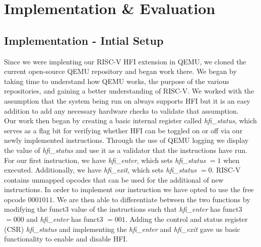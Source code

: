 \documentclass[conference,compsoc]{IEEEtran}
\begin{document}

\section{Implementation \& Evaluation}
\subsection{Implementation - Intial Setup}
Since we were implenting our RISC-V HFI extension in QEMU, we cloned the current open-source QEMU repository and began work there. We began by taking time to understand how QEMU works, the purpose of the various repositories, and gaining a better understanding of RISC-V. We worked with the assumption that the system being run on always supports HFI but it is an easy addition to add any necessary hardware checks to validate that assumption.\\
Our work then began by creating a basic internal register called \textit{hfi\_status}, which serves as a flag bit for verifying whether HFI can be toggled on or off via our newly implemented instructions. Through the use of QEMU logging we display the value of \textit{hfi\_status} and use it as a validator that the instructions have run.
For our first instruction, we have \textit{hfi\_enter}, which sets \textit{hfi\_status} $=1$ when executed. 
Additionally, we have \textit{hfi\_exit}, which sets \textit{hfi\_status} $=0$.
RISC-V contains unmapped opcodes that can be used for the additional of new instructions.
In order to implement our instruction we have opted to use the free opcode $0001011$.
We are then able to differentiate between the two functions by modifying the funct3 value of the instructions such that \textit{hfi\_enter} has funct3 $= 000$ and \textit{hfi\_enter} has funct3 $= 001$. Adding the control and status register (CSR) \textit{hfi\_status} and implementing the \textit{hfi\_enter} and \textit{hfi\_exit} gave us basic functionality to enable and disable HFI.\\
\end{document}
